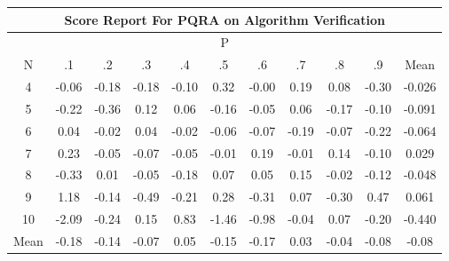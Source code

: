 \documentclass[11pt,a4paper]{report}
\begin{document}
\begin{longtable}{ | c || c | c | c | c | c | c | c | c | c || c |}
\hline
\multicolumn{11}{|c|}{ Score Report For PQRA on Algorithm Verification} \\
\hline
\multicolumn{11}{|c|}{ P } \\
\hline
N & .1 & .2 & .3 & .4 & .5 & .6 & .7 & .8 & .9 & Mean\\
 \hline
 \hline
 \endhead
  4 &  \cellcolor[HTML]{FFFFFF} -0.06 &  \cellcolor[HTML]{FFF7F7} -0.18 &  \cellcolor[HTML]{FFF7F7} -0.18 &  \cellcolor[HTML]{FFFFFF} -0.10 &  \cellcolor[HTML]{F7F7FF} 0.32 &  \cellcolor[HTML]{FFFFFF} -0.00 &  \cellcolor[HTML]{F7F7FF} 0.19 &  \cellcolor[HTML]{FFFFFF} 0.08 &  \cellcolor[HTML]{FFF7F7} -0.30 & -0.026 \\
  5 &  \cellcolor[HTML]{FFF7F7} -0.22 &  \cellcolor[HTML]{FFF7F7} -0.36 &  \cellcolor[HTML]{FFFFFF} 0.12 &  \cellcolor[HTML]{FFFFFF} 0.06 &  \cellcolor[HTML]{FFF7F7} -0.16 &  \cellcolor[HTML]{FFFFFF} -0.05 &  \cellcolor[HTML]{FFFFFF} 0.06 &  \cellcolor[HTML]{FFF7F7} -0.17 &  \cellcolor[HTML]{FFFFFF} -0.10 & -0.091 \\
  6 &  \cellcolor[HTML]{FFFFFF} 0.04 &  \cellcolor[HTML]{FFFFFF} -0.02 &  \cellcolor[HTML]{FFFFFF} 0.04 &  \cellcolor[HTML]{FFFFFF} -0.02 &  \cellcolor[HTML]{FFFFFF} -0.06 &  \cellcolor[HTML]{FFFFFF} -0.07 &  \cellcolor[HTML]{FFF7F7} -0.19 &  \cellcolor[HTML]{FFFFFF} -0.07 &  \cellcolor[HTML]{FFF7F7} -0.22 & -0.064 \\
  7 &  \cellcolor[HTML]{F7F7FF} 0.23 &  \cellcolor[HTML]{FFFFFF} -0.05 &  \cellcolor[HTML]{FFFFFF} -0.07 &  \cellcolor[HTML]{FFFFFF} -0.05 &  \cellcolor[HTML]{FFFFFF} -0.01 &  \cellcolor[HTML]{F7F7FF} 0.19 &  \cellcolor[HTML]{FFFFFF} -0.01 &  \cellcolor[HTML]{FFFFFF} 0.14 &  \cellcolor[HTML]{FFFFFF} -0.10 & 0.029 \\
  8 &  \cellcolor[HTML]{FFF7F7} -0.33 &  \cellcolor[HTML]{FFFFFF} 0.01 &  \cellcolor[HTML]{FFFFFF} -0.05 &  \cellcolor[HTML]{FFF7F7} -0.18 &  \cellcolor[HTML]{FFFFFF} 0.07 &  \cellcolor[HTML]{FFFFFF} 0.05 &  \cellcolor[HTML]{FFFFFF} 0.15 &  \cellcolor[HTML]{FFFFFF} -0.02 &  \cellcolor[HTML]{FFFFFF} -0.12 & -0.048 \\
  9 &  \cellcolor[HTML]{DFDFFF} 1.18 &  \cellcolor[HTML]{FFFFFF} -0.14 &  \cellcolor[HTML]{FFEFEF} -0.49 &  \cellcolor[HTML]{FFF7F7} -0.21 &  \cellcolor[HTML]{F7F7FF} 0.28 &  \cellcolor[HTML]{FFF7F7} -0.31 &  \cellcolor[HTML]{FFFFFF} 0.07 &  \cellcolor[HTML]{FFF7F7} -0.30 &  \cellcolor[HTML]{F7F7FF} 0.47 & 0.061 \\
  10 &  \cellcolor[HTML]{FFC7C7} -2.09 &  \cellcolor[HTML]{FFF7F7} -0.24 &  \cellcolor[HTML]{FFFFFF} 0.15 &  \cellcolor[HTML]{E7E7FF} 0.83 &  \cellcolor[HTML]{FFD7D7} -1.46 &  \cellcolor[HTML]{FFE7E7} -0.98 &  \cellcolor[HTML]{FFFFFF} -0.04 &  \cellcolor[HTML]{FFFFFF} 0.07 &  \cellcolor[HTML]{FFF7F7} -0.20 & -0.440 \\
 \hline
 \hline
Mean &  \cellcolor[HTML]{FFF7F7} -0.18 &  \cellcolor[HTML]{FFFFFF} -0.14 &  \cellcolor[HTML]{FFFFFF} -0.07 &  \cellcolor[HTML]{FFFFFF} 0.05 &  \cellcolor[HTML]{FFFFFF} -0.15 &  \cellcolor[HTML]{FFF7F7} -0.17 &  \cellcolor[HTML]{FFFFFF} 0.03 &  \cellcolor[HTML]{FFFFFF} -0.04 &  \cellcolor[HTML]{FFFFFF} -0.08 &  \cellcolor[HTML]{FFFFFF} -0.08
\end{longtable}
\end{document}
